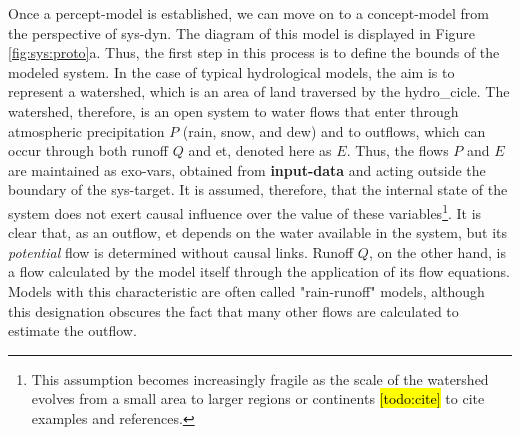 \documentclass[./main_en.tex]{subfiles}
\begin{document}
\par Once a \gls{percept-model} is established, we can move on to a \gls{concept-model} from the perspective of \gls{sys-dyn}. The diagram of this \gls{model} is displayed in Figure \ref{fig:sys:proto}a. Thus, the first step in this process is to define the \gls{bounds} of the modeled system. In the case of typical hydrological models, the aim is to represent a watershed, which is an area of land traversed by the \gls{hydro_cicle}. The watershed, therefore, is an open \gls{system} to water flows that enter through atmospheric precipitation $P$ (rain, snow, and dew) and to outflows, which can occur through both runoff $Q$ and \acrlong{et}, denoted here as $E$. Thus, the flows $P$ and $E$ are maintained as \gls{exo-vars}, obtained from \textbf{\gls{input-data}} and acting outside the boundary of the \gls{sys-target}. It is assumed, therefore, that the internal state of the \gls{system} does not exert causal influence over the value of these variables\footnote{This assumption becomes increasingly fragile as the scale of the watershed evolves from a small area to larger regions or continents \hl{[todo:cite]} to cite examples and references.}. It is clear that, as an outflow, \acrlong{et} depends on the water available in the \gls{system}, but its \textit{potential} flow is determined without causal links. Runoff $Q$, on the other hand, is a flow calculated by the \gls{model} itself through the application of its flow equations. Models with this characteristic are often called "rain-runoff" models, although this designation obscures the fact that many other flows are calculated to estimate the outflow.
\end{document}
